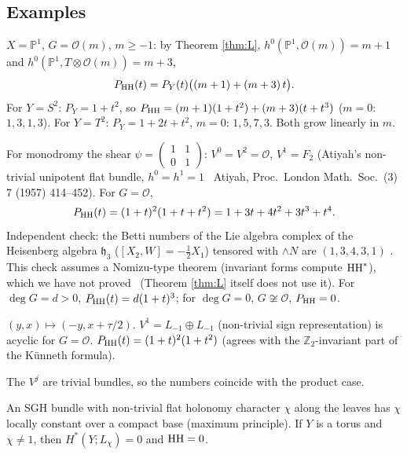 \subsection{Examples}\label{sec:examples}
\begin{ex}\tP\tV
$X=\mathbb P^1$, $G=\mathcal O(m)$, $m\ge-1$: by Theorem \ref{thm:L}, $h^0(\mathbb P^1,\mathcal O(m))=m+1$ and $h^0(\mathbb P^1,T\otimes\mathcal O(m))=m+3$,
\[P_{\mathrm{HH}}(t)=P_Y(t)\bigl((m+1)+(m+3)\,t\bigr).\]
For $Y=S^2$: $P_Y=1+t^2$, so $P_{\mathrm{HH}}=(m+1)(1+t^2)+(m+3)(t+t^3)$ ($m=0$: $1,3,1,3$). For $Y=T^2$: $P_Y=1+2t+t^2$, $m=0$: $1,5,7,3$. Both grow linearly in $m$.
\end{ex}
\begin{ex}\tP\tV\tQ
For monodromy the shear $\psi=\begin{pmatrix}1&1\\0&1\end{pmatrix}$: $V^0=V^2=\mathcal O$, $V^1=F_2$ (Atiyah's non-trivial unipotent flat bundle, $h^0=h^1=1$ \tC\ Atiyah, Proc.\ London Math.\ Soc.\ (3) 7 (1957) 414--452). For $G=\mathcal O$,
\[P_{\mathrm{HH}}(t)=(1+t)^2(1+t+t^2)=1+3t+4t^2+3t^3+t^4.\]
Independent check: the Betti numbers of the Lie algebra complex of the Heisenberg algebra $\mathfrak h_3$ ($[X_2,W]=-\tfrac12X_1$) tensored with $\wedge N$ are $(1,3,4,3,1)$ \tV. This check assumes a Nomizu-type theorem (invariant forms compute $\mathrm{HH}^*$), which we have not proved \tQ\ (Theorem \ref{thm:L} itself does not use it). For $\deg G=d>0$, $P_{\mathrm{HH}}(t)=d(1+t)^3$; for $\deg G=0$, $G\not\cong\mathcal O$, $P_{\mathrm{HH}}=0$.
\end{ex}
\begin{ex}\tP\tV
$(y,x)\mapsto(-y,x+\tau/2)$. $V^1=L_{-1}\oplus L_{-1}$ (non-trivial sign representation) is acyclic for $G=\mathcal O$. $P_{\mathrm{HH}}(t)=(1+t)^2(1+t^2)$ (agrees with the $\mathbb Z_2$-invariant part of the Künneth formula).
\end{ex}
\begin{ex}\tP
The $V^j$ are trivial bundles, so the numbers coincide with the product case.
\end{ex}
\begin{rem}
An SGH bundle with non-trivial flat holonomy character $\chi$ along the leaves has $\chi$ locally constant over a compact base (maximum principle). If $Y$ is a torus and $\chi\neq1$, then $H^*(Y;L_\chi)=0$ and $\mathrm{HH}=0$. \tP
\end{rem}

